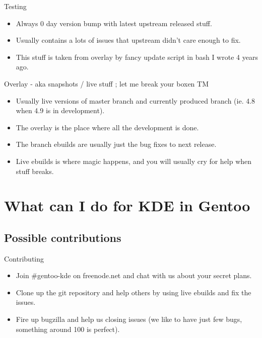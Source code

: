 \documentclass{beamer}
\begin{document}
\begin{frame}{Testing}
	\begin{itemize}
		\item Always 0 day version bump with latest upstream released stuff.
		\item Usually contains a lots of issues that upstream didn't care enough to fix.
		\item This stuff is taken from overlay by fancy update script in bash I wrote 4 years ago.
	\end{itemize}
\end{frame}

\begin{frame}{Overlay - aka snapshots / live stuff ; let me break your boxen TM}
	\begin{itemize}
		\item Usually live versions of master branch and currently produced branch (ie. 4.8 when 4.9 is in development).
		\item The overlay is the place where all the development is done.
		\item The branch ebuilds are usually just the bug fixes to next release.
		\item Live ebuilds is where magic happens, and you will usually cry for help when stuff breaks.
	\end{itemize}
\end{frame}

\section{What can I do for KDE in Gentoo}

\subsection{Possible contributions}

\begin{frame}{Contributing}
	\begin{itemize}
		\item Join \#gentoo-kde on freenode.net and chat with us about your secret plans.
		\item Clone up the git repository and help others by using live ebuilds and fix the issues.
		\item Fire up bugzilla and help us closing issues (we like to have just few bugs, something around 100 is perfect).
	\end{itemize}
\end{frame}
\end{document}
